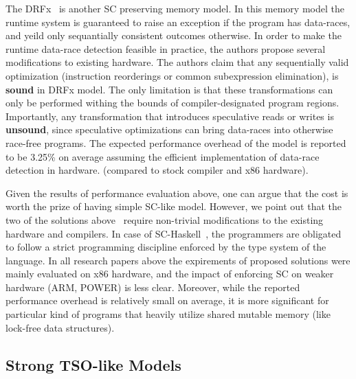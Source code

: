 The DRFx~\cite{Marino-al:PLDI10} is another 
SC preserving memory model. In this memory model
the runtime system is guaranteed to raise 
an exception if the program has data-races, 
and yeild only sequantially consistent outcomes otherwise.
In order to make the runtime data-race detection feasible 
in practice, the authors propose several modifications 
to existing hardware.
The authors claim that any sequentially valid optimization 
(\eg instruction reorderings or common subexpression elimination),
is \textbf{sound} in DRFx model.
The only limitation is that these transformations can only be performed
withing the bounds of compiler-designated program regions.
Importantly, any transformation that introduces 
speculative reads or writes is \textbf{unsound},
since speculative optimizations can bring
data-races into otherwise race-free programs.
The expected performance overhead of the model 
is reported to be 3.25\% on average
assuming the efficient implementation 
of data-race detection in hardware. 
(compared to stock compiler and x86 hardware). 


Given the results of performance evaluation above,
one can argue that the cost is worth the prize
of having simple SC-like model.
However, we point out that the two 
of the solutions above~\cite{Singh-al:ISCA12, Marino-al:PLDI10} 
require non-trivial modifications to the 
existing hardware and compilers.
In case of SC-Haskell~\cite{Vollmer-al:PPoPP17}, 
the programmers are obligated to follow 
a strict programming discipline enforced 
by the type system of the language.
In all research papers above  the expirements 
of proposed solutions were mainly evaluated on x86 hardware, 
and the impact of enforcing SC on weaker hardware
(ARM, POWER) is less clear.
Moreover, while the reported performance overhead 
is relatively small on average, 
it is more significant for particular 
kind of programs that heavily utilize shared 
mutable memory (like lock-free data structures).

\subsection{Strong TSO-like Models}

